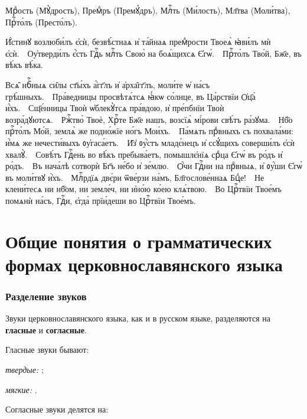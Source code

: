 \documentclass[11pt,a4paper,oneside]{memoir}
\begin{document}
    \begin{slv}
        Мрⷣость (Мꙋ̀дрость), Премⷣръ (Премꙋ́дръ), Млⷭ҇ть (Ми́лость), Мл҃тва (Моли́тва), Прⷭ҇то́лъ (Престо́лъ).
        
        И҆́стинꙋ возлюби́лъ є҆сѝ, безвѣ́стнаѧ и҆ та́йнаѧ премⷣрости Твоеѧ̀ ꙗ҆ви́лъ мѝ є҆сѝ.~\textemdash~Оу҆тверди́лъ є҆́сть Гдⷭ҇ь млⷭ҇ть Свою̀ на боѧ́щихсѧ Є҆гѡ́.~\textemdash~Прⷭ҇то́лъ Тво́й, Бж҃е, въ вѣ́къ вѣ́ка.
        
        Всѧ̑ нбⷭ҇ныѧ си̑лы ст҃ы́хъ а҆́гг҃лъ и҆ а҆рха̑гг҃лъ, моли́те ѡ҆ на́съ грѣ́шныхъ.~\textemdash~Пра́ведницы просвѣтѧ́тсѧ ꙗ҆́кѡ со́лнце, въ Ца́рствїи Ѻ҆ц҃а̀ и҆́хъ.~\textemdash~Сщ҃е́нницы Твоѝ ѡ҆блекꙋ̀тсѧ пра́вдою, и҆ пре́пбнїи Твоѝ возра́дꙋютсѧ.~\textemdash~Ржⷭ҇тво̀ Твоѐ, Хрⷭ҇те Бж҃е нашъ, возсїѧ̀ мі́рови свѣ́тъ ра́зꙋма.~\textemdash~Нб҃о прⷭ҇то́лъ Мо́й, землѧ̀ же подно́жїе но́гъ Мои́хъ.~\textemdash~Па́мѧть прⷣвныхъ съ похвала́ми: и҆́мѧ же нечести́выхъ ᲂу҆гаса́етъ.~\textemdash~И̑з̾ ᲂу҆́стъ младє́нецъ и҆ ссꙋ́щихъ соверши́лъ є҆сѝ хвалꙋ̀.~\textemdash~Совѣ́тъ Гдⷭ҇ень во вѣ́къ пребыва́етъ, помышлє҆нїѧ срⷣца Є҆гѡ́ въ ро́дъ и҆ ро́дъ.~\textemdash~Въ нача́лѣ сотворѝ Бг҃ъ не́бо и҆ зе́млю.~\textemdash~Ѻ҆́чи Гдⷭ҇ни на прⷣвныѧ, и҆ ᲂу҆́ши Є҆гѡ́ въ моли́твꙋ и҆̀хъ.~\textemdash~Млⷭ҇рдїѧ двє́ри ѿве́рзи на́мъ, Бл҃гослове́ннаѧ Бцⷣе!~\textemdash~Не клени́тесѧ ни нб҃ом, ни земле́ч, ни и҆но́ю ко́ею клѧ́твою.~\textemdash~Во Црⷭ҇твїи Твое́мъ помѧнѝ на́съ, Гдⷭ҇и, є҆гда̀ прїи́деши во Црⷭ҇твїи Твое́мъ.
    \end{slv}


        \section[Общие понятия о грамматических формах]{Общие понятия о грамматических формах церковнославянского языка}
                \subsubsection{Разделение звуков}

    \medskip
    Звуки церковнославянского языка, как и в русском языке, разделяются на \textbf{гласные} и \textbf{согласные}.
    \medskip
    
    Гласные звуки бывают:
    \medskip
    
    \emph{твердые:} {};

    \emph{мягкие:} {\slv{}}.
    \medskip
    
    Согласные звуки делятся на:
    \medskip
    
\end{document}
